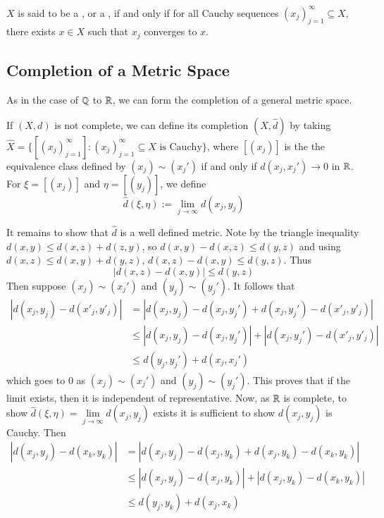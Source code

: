 \begin{defn}
    $X$ is said to be a , or a , if and only if for all Cauchy sequences $(x_j)_{j=1}^{\infty} \subseteq X$, there exists $x \in X$ such that $x_j$ converges to $x$.
\end{defn}

\subsection{Completion of a Metric Space}

As in the case of $\mathbb Q$ to $\mathbb R$, we can form the completion of a general metric space.

\begin{defn}
    If $(X,d)$ is not complete, we can define its completion $(\hat{X},\hat{d})$ by taking $\hat{X} = \{[(x_j)_{j=1}^{\infty}] : (x_j)_{j=1}^{\infty}\subseteq X\text{ is Cauchy}\}$, where $[(x_j)]$ is the the equivalence class defined by $(x_j) \sim (x_j')$ if and only if $d(x_j,x_j') \rightarrow 0$ in $\mathbb R$. For $\xi = [(x_j)]$ and $\eta = [(y_j)]$, we define \begin{equation*}
        \hat{d}(\xi,\eta) := \lim\limits_{j\rightarrow \infty}d(x_j,y_j)
    \end{equation*}
\end{defn}
It remains to show that $\hat{d}$ is a well defined metric. Note by the triangle inequality $d(x,y) \leq d(x,z) + d(z,y)$, so $d(x,y) - d(x,z) \leq d(y,z)$ and using $d(x,z) \leq d(x,y) + d(y,z)$, $d(x,z) - d(x,y) \leq d(y,z)$. Thus $$|d(x,z) - d(x,y)| \leq d(y,z)$$ Then suppose $(x_j) \sim (x_j')$ and $(y_j) \sim (y_j')$. It follows that \begin{align*}
    |d(x_j,y_j) - d(x'_j,y'_j)| &= |d(x_j,y_j) - d(x_j,y_j') + d(x_j,y_j') - d(x'_j,y'_j)| \\
    &\leq |d(x_j,y_j) - d(x_j,y_j')| + |d(x_j,y_j') - d(x'_j,y'_j)| \\
    &\leq d(y_j,y_j') + d(x_j,x_j')
\end{align*}
which goes to $0$ as $(x_j)\sim(x_j')$ and $(y_j)\sim(y_j')$. This proves that if the limit exists, then it is independent of representative. Now, as $\mathbb R$ is complete, to show $\hat{d}(\xi,\eta) = \lim\limits_{j\rightarrow \infty}d(x_j,y_j)$ exists it is sufficient to show $d(x_j,y_j)$ is Cauchy. Then \begin{align*}
    |d(x_j,y_j) - d(x_k,y_k)| &= |d(x_j,y_j) - d(x_j,y_k) + d(x_j,y_k) - d(x_k,y_k)| \\
    &\leq |d(x_j,y_j) - d(x_j,y_k)| + |d(x_j,y_k) - d(x_k,y_k)| \\
    &\leq d(y_j,y_k) + d(x_j,x_k)
\end{align*}
